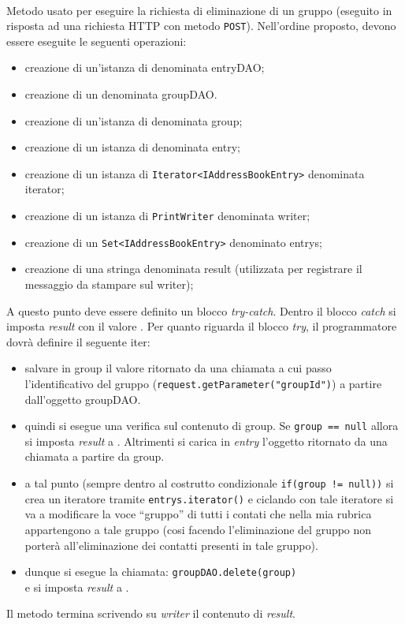 \begin{description}
	\item{}\\	
	Metodo usato per eseguire la richiesta di eliminazione di un gruppo (eseguito in risposta ad una richiesta HTTP con metodo \texttt{POST}). Nell'ordine proposto, devono essere eseguite le seguenti operazioni:
	\begin{itemize}
		\item creazione di un'istanza di  denominata entryDAO;
		\item creazione di un  denominata groupDAO.
		\item creazione di un'istanza di  denominata group;
		\item creazione di un istanza di  denominata entry;
		\item creazione di un istanza di \texttt{Iterator<IAddressBookEntry>} denominata iterator;
		\item creazione di un istanza di \texttt{PrintWriter} denominata writer;
		\item creazione di un \texttt{Set<IAddressBookEntry>} denominato entrys;
		\item creazione di una stringa denominata result (utilizzata per registrare il messaggio da stampare sul writer);
	\end{itemize} 
	A questo punto deve essere definito un blocco \textit{try-catch}. Dentro il blocco \textit{catch} si  imposta \textit{result} con il valore . Per quanto riguarda il blocco \textit{try}, il programmatore dovrà definire il seguente iter:
	\begin{itemize}
		\item salvare in group il valore ritornato da una chiamata  a cui passo l'identificativo del gruppo (\texttt{request.getParameter("groupId")}) a partire dall'oggetto groupDAO.
		\item quindi si esegue una verifica sul contenuto di group. Se \texttt{group == null} allora si imposta \textit{result} a . Altrimenti si carica in \textit{entry} l'oggetto ritornato da una chiamata  a partire da group.
		\item a tal punto (sempre dentro al costrutto condizionale \texttt{if(group != null))} si crea un iteratore tramite \texttt{entrys.iterator()} e ciclando con tale iteratore si va a modificare la voce ``gruppo'' di tutti i contati che nella mia rubrica appartengono a tale gruppo (cosi facendo l'eliminazione del gruppo non porterà all'eliminazione dei contatti presenti in tale gruppo).
		\item dunque si esegue la chiamata:
		\verb|groupDAO.delete(group)|\\
		e si imposta \textit{result} a .
	\end{itemize}
	Il metodo termina scrivendo su \textit{writer} il contenuto di \textit{result}.
	
\end{description}

